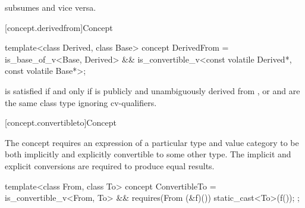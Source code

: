 \begin{itemdescr}
\pnum
{} subsumes  and
vice versa.
\end{itemdescr}

[concept.derivedfrom]{Concept }

%
\begin{itemdecl}
template<class Derived, class Base>
  concept DerivedFrom =
    is_base_of_v<Base, Derived> &&
    is_convertible_v<const volatile Derived*, const volatile Base*>;
\end{itemdecl}

\begin{itemdescr}
\pnum
\begin{note}
 is satisfied if and only if
 is publicly and unambiguously derived from , or
 and  are the same class type ignoring cv-qualifiers.
\end{note}
\end{itemdescr}

[concept.convertibleto]{Concept }

\pnum
The  concept requires an expression of a particular
type and value category to be both implicitly and explicitly convertible to some
other type. The implicit and explicit conversions are required to produce equal
results.

%
\begin{itemdecl}
template<class From, class To>
  concept ConvertibleTo =
    is_convertible_v<From, To> &&
    requires(From (&f)()) {
      static_cast<To>(f());
    };
\end{itemdecl}

